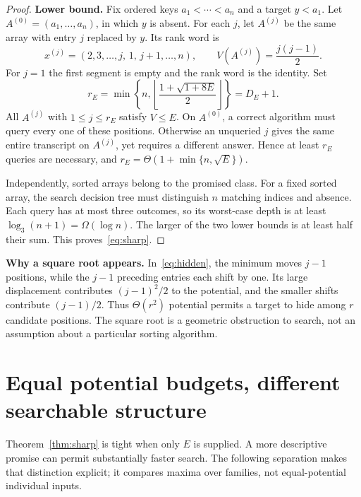 \documentclass[10pt,letterpaper]{article}
\begin{document}
\begin{proof}
\textbf{Lower bound.} Fix ordered keys $a_1<\cdots<a_n$ and a target $y<a_1$.
Let $A^{(0)}=(a_1,\ldots,a_n)$, in which $y$ is absent. For each $j$, let $A^{(j)}$
be the same array with entry $j$ replaced by $y$. Its rank word is
\begin{equation}
 x^{(j)}=(2,3,\ldots,j,\,1,\,j+1,\ldots,n),
 \qquad V(A^{(j)})=\frac{j(j-1)}2. \label{eq:hidden}
\end{equation}
For $j=1$ the first segment is empty and the rank word is the identity. Set
\begin{equation}
 r_E=\min\left\{n,\left\lfloor\frac{1+\sqrt{1+8E}}2\right\rfloor\right\}=D_E+1.
 \label{eq:rE}
\end{equation}
All $A^{(j)}$ with $1\leq j\leq r_E$ satisfy $V\leq E$. On $A^{(0)}$, a correct
algorithm must query every one of these positions. Otherwise an unqueried $j$ gives
the same entire transcript on $A^{(j)}$, yet requires a different answer. Hence at
least $r_E$ queries are necessary, and $r_E=\Theta(1+\min\{n,\sqrt E\})$.

Independently, sorted arrays belong to the promised class. For a fixed sorted array,
the search decision tree must distinguish $n$ matching indices and absence. Each query
has at most three outcomes, so its worst-case depth is at least
$\log_3(n+1)=\Omega(\log n)$. The larger of the two lower bounds is at least half
their sum. This proves~\eqref{eq:sharp}.
\end{proof}

\textbf{Why a square root appears.} In~\eqref{eq:hidden}, the minimum moves $j-1$ positions,
while the $j-1$ preceding entries each shift by one. Its large displacement contributes
$(j-1)^2/2$ to the potential, and the smaller shifts contribute $(j-1)/2$.
Thus $\Theta(r^2)$ potential permits a target to hide among $r$ candidate positions.
The square root is a geometric obstruction to search, not an assumption about a
particular sorting algorithm.

\newpage
\section{Equal potential budgets, different searchable structure}
Theorem~\ref{thm:sharp} is tight when only $E$ is supplied. A more descriptive promise
can permit substantially faster search. The following separation makes that distinction
explicit; it compares maxima over families, not equal-potential individual inputs.
\end{document}
